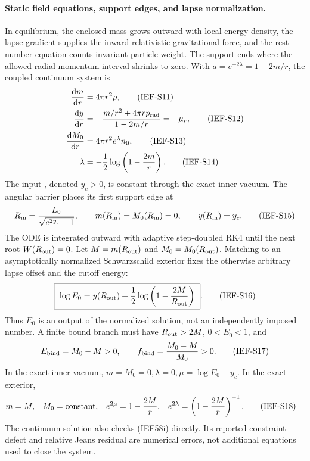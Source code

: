 \paragraph{Static field equations, support edges, and lapse normalization.}
In equilibrium, the enclosed mass grows outward with local energy density,
the lapse gradient supplies the inward relativistic gravitational force, and
the rest-number equation counts invariant particle weight.  The support ends
where the allowed radial-momentum interval shrinks to zero.  With
\(a=e^{-2\lambda}=1-2m/r\), the coupled continuum system is
\begin{align}
 \frac{\mathrm d m}{\mathrm d r}&=4\pi r^2\rho,                    \tag{IEF-S11}\\
 \frac{\mathrm d y}{\mathrm d r}&=-\frac{m/r^2+4\pi r p_{\rm rad}}
                              {1-2m/r}=-\mu_r,          \tag{IEF-S12}\\
 \frac{\mathrm d M_0}{\mathrm d r}&=4\pi r^2 e^\lambda n_0,       \tag{IEF-S13}\\
 \lambda&=-\frac12\log\left(1-\frac{2m}{r}\right).
                                                               \tag{IEF-S14}
\end{align}
The input , denoted \(y_c>0\), is constant through the exact
inner vacuum.  The angular barrier places its first support edge at
\[
 R_{\rm in}=\frac{L_0}{\sqrt{e^{2y_c}-1}},
 \qquad m(R_{\rm in})=M_0(R_{\rm in})=0,
 \qquad y(R_{\rm in})=y_c.                            \tag{IEF-S15}
\]
The ODE is integrated outward with adaptive step-doubled RK4 until the next
root \(W(R_{\rm out})=0\).  Let \(M=m(R_{\rm out})\) and
\(M_0=M_0(R_{\rm out})\).  Matching to an asymptotically normalized
Schwarzschild exterior fixes the otherwise arbitrary lapse offset and the
cutoff energy:
\[
 \boxed{\ \log E_0=y(R_{\rm out})
       +\frac12\log\left(1-\frac{2M}{R_{\rm out}}\right)\ }.
                                                               \tag{IEF-S16}
\]
Thus \(E_0\) is an output of the normalized solution, not an independently
imposed number.  A finite bound branch must have
\(R_{\rm out}>2M\), \(0<E_0<1\), and
\[
 E_{\rm bind}=M_0-M>0,\qquad
 f_{\rm bind}=\frac{M_0-M}{M_0}>0.                    \tag{IEF-S17}
\]
In the exact inner vacuum,
\(m=M_0=0,\lambda=0,\mu=\log E_0-y_c\).  In the exact exterior,
\begin{align}
 m&=M,&M_0&=\hbox{constant},&
 e^{2\mu}&=1-\frac{2M}{r},&e^{2\lambda}&=
       \left(1-\frac{2M}{r}\right)^{-1}.              \tag{IEF-S18}
\end{align}
The continuum solution also checks (IEF58i) directly.  Its reported
constraint defect and relative Jeans residual are numerical errors, not
additional equations used to close the system.

